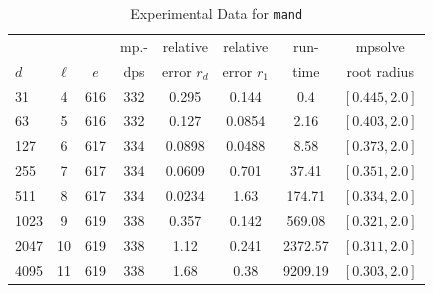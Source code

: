 \documentclass[runningheads]{llncs}
\begin{document}
\begin{table}
\caption{Experimental Data for \texttt{mand}} %
\label{tab:mand}
\vskip -0.15in
\begin{center}
\begin{small}
\begin{sc}
\begin{tabular}{lccccccc}
\toprule
&  &  & mp.-& relative  & relative & run- & mpsolve \\
$d$& $\ell$& $e$ & dps&error $r_d$       & error $r_1$ &time& root radius\\
\midrule
   31 & 4 & 616 & 332 & 0.295 & 0.144 & 0.4 & $[0.445, 2.0]$\\
   63 & 5 & 616 & 332 & 0.127 & 0.0854 & 2.16 & $[0.403, 2.0]$\\
 127 & 6 & 617 & 334 & 0.0898 & 0.0488 & 8.58 & $[0.373, 2.0]$\\
 255 & 7 & 617 & 334 & 0.0609 & 0.701 & 37.41 & $[0.351, 2.0]$\\
 511 & 8 & 617 & 334 & 0.0234 & 1.63 & 174.71 & $[0.334, 2.0]$\\
1023 & 9 & 619 & 338 & 0.357 & 0.142 & 569.08 & $[0.321, 2.0]$\\
2047 & 10 & 619 & 338 & 1.12 & 0.241 & 2372.57 & $[0.311, 2.0]$\\
4095 & 11 & 619 & 338 & 1.68 & 0.38 & 9209.19 & $[0.303, 2.0]$\\
\bottomrule
\end{tabular}
\end{sc}
\end{small}
\end{center}
\vskip 0.05in
\end{table}
\end{document}
